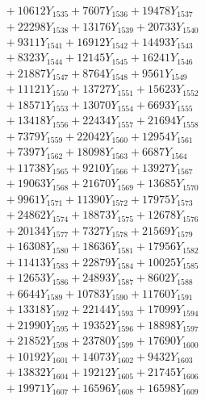 \documentclass[a4paper,10pt]{article}
\begin{document}
{\begin{align}
&\;  + 10612 Y_{1535} + 7607 Y_{1536} + 19478 Y_{1537} \\[0.3ex]
&\;  + 22298 Y_{1538} + 13176 Y_{1539} + 20733 Y_{1540} \\[0.3ex]
&\;  + 9311 Y_{1541} + 16912 Y_{1542} + 14493 Y_{1543} \\[0.3ex]
&\;  + 8323 Y_{1544} + 12145 Y_{1545} + 16241 Y_{1546} \\[0.3ex]
&\;  + 21887 Y_{1547} + 8764 Y_{1548} + 9561 Y_{1549} \\[0.3ex]
&\;  + 11121 Y_{1550} + 13727 Y_{1551} + 15623 Y_{1552} \\[0.3ex]
&\;  + 18571 Y_{1553} + 13070 Y_{1554} + 6693 Y_{1555} \\[0.3ex]
&\;  + 13418 Y_{1556} + 22434 Y_{1557} + 21694 Y_{1558} \\[0.5ex]\allowbreak
&\;  + 7379 Y_{1559} + 22042 Y_{1560} + 12954 Y_{1561} \\[0.3ex]
&\;  + 7397 Y_{1562} + 18098 Y_{1563} + 6687 Y_{1564} \\[0.3ex]
&\;  + 11738 Y_{1565} + 9210 Y_{1566} + 13927 Y_{1567} \\[0.3ex]
&\;  + 19063 Y_{1568} + 21670 Y_{1569} + 13685 Y_{1570} \\[0.3ex]
&\;  + 9961 Y_{1571} + 11390 Y_{1572} + 17975 Y_{1573} \\[0.3ex]
&\;  + 24862 Y_{1574} + 18873 Y_{1575} + 12678 Y_{1576} \\[0.3ex]
&\;  + 20134 Y_{1577} + 7327 Y_{1578} + 21569 Y_{1579} \\[0.3ex]
&\;  + 16308 Y_{1580} + 18636 Y_{1581} + 17956 Y_{1582} \\[0.3ex]
&\;  + 11413 Y_{1583} + 22879 Y_{1584} + 10025 Y_{1585} \\[0.3ex]
&\;  + 12653 Y_{1586} + 24893 Y_{1587} + 8602 Y_{1588} \\[0.5ex]\allowbreak
&\;  + 6644 Y_{1589} + 10783 Y_{1590} + 11760 Y_{1591} \\[0.3ex]
&\;  + 13318 Y_{1592} + 22144 Y_{1593} + 17099 Y_{1594} \\[0.3ex]
&\;  + 21990 Y_{1595} + 19352 Y_{1596} + 18898 Y_{1597} \\[0.3ex]
&\;  + 21852 Y_{1598} + 23780 Y_{1599} + 17690 Y_{1600} \\[0.3ex]
&\;  + 10192 Y_{1601} + 14073 Y_{1602} + 9432 Y_{1603} \\[0.3ex]
&\;  + 13832 Y_{1604} + 19212 Y_{1605} + 21745 Y_{1606} \\[0.3ex]
&\;  + 19971 Y_{1607} + 16596 Y_{1608} + 16598 Y_{1609} \\[0.3ex]

\end{align}}
\end{document}
